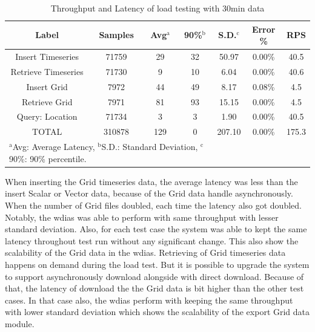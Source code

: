 \documentclass[conference]{IEEEtran}
\begin{document}
\begin{table}[htbp]
\caption{ Throughput and Latency of load testing with 30min data}
\begin{center}
\begin{adjustbox}{width=0.45\textwidth}
\footnotesize
\begin{tabular}{|c|c|c|c|c|c|c|}
\hline
\textbf{Label} & \textbf{Samples} & \textbf{Avg$^{\mathrm{a}}$} & \textbf{90\%$^{\mathrm{b}}$} & \textbf{S.D.$^{\mathrm{c}}$} & \textbf{Error \%} & \textbf{RPS} \\ \hline
Insert Timeseries & 71759 & 29 & 32 & 50.97 & 0.00\% & 40.5 \\ \hline
Retrieve Timeseries & 71730 & 9 & 10 & 6.04 & 0.00\% & 40.6 \\ \hline
Insert Grid & 7972 & 44 & 49 & 8.17 & 0.08\% & 4.5 \\ \hline
Retrieve Grid & 7971 & 81 & 93 & 15.15 & 0.00\% & 4.5 \\ \hline
Query: Location & 71734 & 3 & 3 & 1.90 & 0.00\% & 40.5 \\ \hline
TOTAL & 310878 & 129 & 0 & 207.10 & 0.00\% & 175.3 \\ \hline
\multicolumn{4}{l}{$^{\mathrm{a}}$Avg: Average Latency, $^{\mathrm{b}}$S.D.: Standard Deviation, $^{\mathrm{c}}$90\%: 90\% percentile.}
\end{tabular}
\end{adjustbox}
\label{ptab:obs_all_30_min_summary_throughput}
\end{center}
\end{table}

When inserting the Grid timeseries data, the average latency was less than the insert Scalar or Vector data, because of the Grid data handle asynchronously. When the number of Grid files doubled, each time the latency also got doubled. Notably, the \acrshort{wdias} was able to perform with same throughput with lesser standard deviation. Also, for each test case the system was able to kept the same latency throughout test run without any significant change. This also show the scalability of the Grid data in the \acrshort{wdias}.
Retrieving of Grid timeseries data happens on demand during the load test. But it is possible to upgrade the system to support asynchronously download alongside with direct download. Because of that, the latency of download the the Grid data is bit higher than the other test cases. In that case also, the \acrshort{wdias} perform with keeping the same throughput with lower standard deviation which shows the scalability of the export Grid data module.
\end{document}
